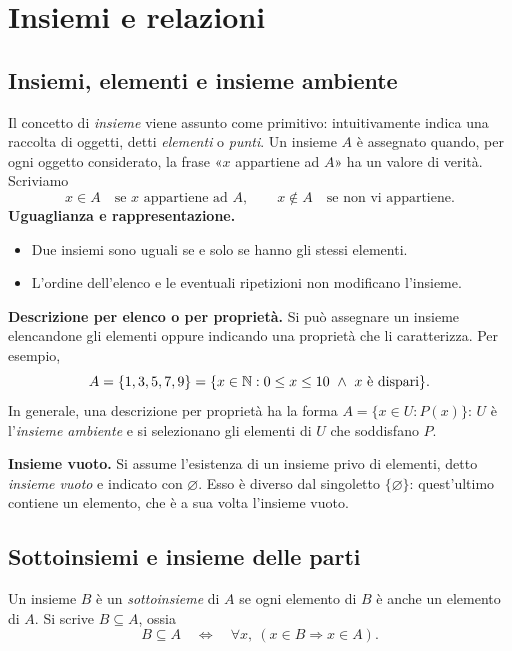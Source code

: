 \chapter{Insiemi e relazioni}
\label{cap:insiemi}

\section{Insiemi, elementi e insieme ambiente}

Il concetto di \emph{insieme} viene assunto come primitivo: intuitivamente indica una raccolta di oggetti, detti \emph{elementi} o \emph{punti}. Un insieme $A$ è assegnato quando, per ogni oggetto considerato, la frase «$x$ appartiene ad $A$» ha un valore di verità. Scriviamo
\[
  x\in A\quad\text{se $x$ appartiene ad $A$},\qquad
  x\notin A\quad\text{se non vi appartiene}.
\]
\textbf{Uguaglianza e rappresentazione.}
\begin{itemize}
  \item Due insiemi sono uguali se e solo se hanno gli stessi elementi.
  \item L'ordine dell'elenco e le eventuali ripetizioni non modificano l'insieme.
\end{itemize}

\textbf{Descrizione per elenco o per proprietà.} Si può assegnare un insieme elencandone gli elementi oppure indicando una proprietà che li caratterizza. Per esempio,
\[
  A=\{1,3,5,7,9\}
   =\{x\in\mathbb{N}:0\le x\le10\ \land\ x\text{ è dispari}\}.
\]
In generale, una descrizione per proprietà ha la forma $A=\{x\in U:P(x)\}$: $U$ è l'\emph{insieme ambiente} e si selezionano gli elementi di $U$ che soddisfano $P$.

\textbf{Insieme vuoto.} Si assume l'esistenza di un insieme privo di elementi, detto \emph{insieme vuoto} e indicato con $\varnothing$. Esso è diverso dal singoletto $\{\varnothing\}$: quest'ultimo contiene un elemento, che è a sua volta l'insieme vuoto.

\section{Sottoinsiemi e insieme delle parti}

\begin{definizione}[Inclusione]
Un insieme $B$ è un \emph{sottoinsieme} di $A$ se ogni elemento di $B$ è anche un elemento di $A$. Si scrive $B\subseteq A$, ossia
\[
  B\subseteq A\quad\Longleftrightarrow\quad
  \forall x,\ (x\in B\Rightarrow x\in A).
\]
\end{definizione}


